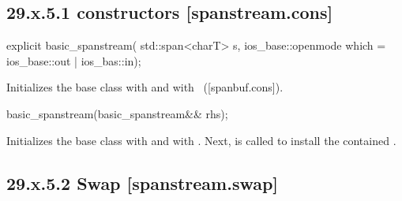\documentclass[ebook,11pt,article]{memoir}
\renewcommand{\iref}[1]{[#1]}
\begin{document}

\subsection{29.x.5.1  constructors [spanstream.cons]}
\label{spanstream.cons}

\begin{itemdecl}
explicit basic_spanstream(
  std::span<charT> s,
  ios_base::openmode which = ios_base::out | ios_bas::in);
\end{itemdecl}

\begin{itemdescr}
\pnum
\effects
Initializes the base class with
and  with
~(\iref{spanbuf.cons}).
\end{itemdescr}

\begin{itemdecl}
basic_spanstream(basic_spanstream&& rhs);
\end{itemdecl}

\begin{itemdescr}
\pnum
\effects Initializes the base class with  
and  with .
Next,  is called to
install the contained .
\end{itemdescr}

\subsection{29.x.5.2 Swap [spanstream.swap]}
\label{spanstream.swap}
\end{document}
